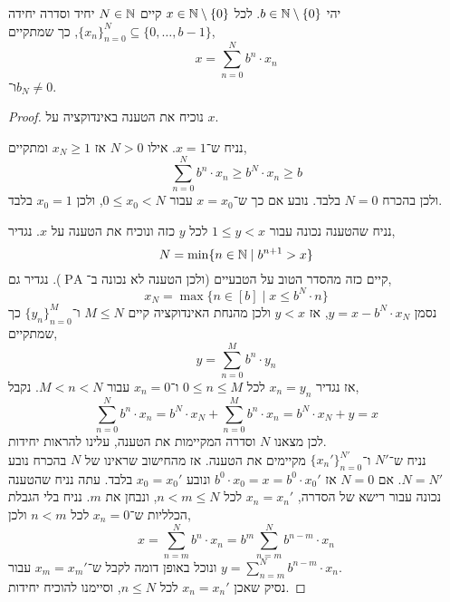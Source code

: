 

\usepackage{emoji}



\begin{proposition}
	יהי $b \in \mathbb{N} \setminus \{ 0 \}$.
	לכל $x \in \mathbb{N} \setminus \{ 0 \}$ קיים $N \in \mathbb{N}$ יחיד וסדרה יחידה ${\{ x_n \}}_{n = 0}^N \subseteq \{0, \ldots, b - 1\}$,
	כך שמתקיים,
	\[
		x
		= \sum_{n = 0}^N b^n \cdot x_n
	\]
	ו־$b_N \ne 0$.
\end{proposition}
\begin{proof}
	נוכיח את הטענה באינדוקציה על $x$.

	נניח ש־$x = 1$.
	אילו $N > 0$ אז $x_N \ge 1$ ומתקיים,
	\[
		\sum_{n = 0}^N b^n \cdot x_n
		\ge b^N \cdot x_n
		\ge b
	\]
	ולכן בהכרח $N = 0$ בלבד.
	נובע אם כך ש־$x = x_0$ עבור $0 \le x_0 < N$, ולכן $x_0 = 1$ בלבד.

	נניח שהטענה נכונה עבור $1 \le y < x$ לכל $y$ כזה ונוכיח את הטענה על $x$.
	נגדיר,
	\[
		N
		= \min\{ n \in \mathbb{N} \mid b^{n + 1} > x \}
	\]
	קיים כזה מהסדר הטוב על הטבעיים (ולכן הטענה לא נכונה ב־$\operatorname{PA}$).
	נגדיר גם,
	\[
		x_N
		= \max\{ n \in [b] \mid x \le b^N \cdot n \}
	\]
	נסמן $y = x - b^N \cdot x_N$, אז $y < x$ ולכן מהנחת האינדוקציה קיים $M \le N$ ו־${\{ y_n \}}_{n = 0}^M$ כך שמתקיים,
	\[
		y
		= \sum_{n = 0}^M b^n \cdot y_n
	\]
	אז נגדיר $x_n = y_n$ לכל $0 \le n \le M$ ו־$x_n = 0$ עבור $M < n < N$.
	נקבל,
	\[
		\sum_{n = 0}^N b^n \cdot x_n
		= b^N \cdot x_N + \sum_{n = 0}^M b^n \cdot x_n
		= b^N \cdot x_N + y
		= x
	\]
	לכן מצאנו $N$ וסדרה המקיימות את הטענה, עלינו להראות יחידות. \\
	נניח ש־$N'$ ו־${\{ x_n' \}}_{n = 0}^{N'}$ מקיימים את הטענה.
	אז מהחישוב שראינו של $N$ בהכרח נובע $N = N'$.
	אם $N = 0$ אז $b^0 \cdot x_0 = x = b^0 \cdot x_0'$ ונובע $x_0 = x_0'$ בלבד.
	עתה נניח שהטענה נכונה עבור רישא של הסדרה, $x_n = x_n'$ לכל $n < m \le N$, ונבחן את $m$.
	נניח בלי הגבלת הכלליות ש־$x_n = 0$ לכל $n < m$ ולכן,
	\[
		x
		= \sum_{n = m}^N b^n \cdot x_n
		= b^m \sum_{n = m}^N b^{n - m} \cdot x_n
	\]
	ונוכל באופן דומה לקבל ש־$x_m = x_m'$ עבור $y = \sum_{n = m}^N b^{n - m} \cdot x_n$. \\
	נסיק שאכן $x_n = x_n'$ לכל $n \le N$, וסיימנו להוכיח יחידות.
\end{proof}


